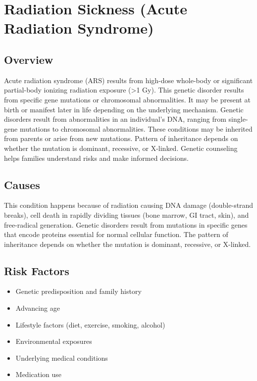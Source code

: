 \chapter{Radiation Sickness (Acute Radiation Syndrome)}
\label{sec:Radiation Sickness}

\section{Overview}
Acute radiation syndrome (ARS) results from high-dose whole-body or significant partial-body ionizing radiation exposure (>1 Gy). This genetic disorder results from specific gene mutations or chromosomal abnormalities. It may be present at birth or manifest later in life depending on the underlying mechanism. Genetic disorders result from abnormalities in an individual's DNA, ranging from single-gene mutations to chromosomal abnormalities. These conditions may be inherited from parents or arise from new mutations. Pattern of inheritance depends on whether the mutation is dominant, recessive, or X-linked. Genetic counseling helps families understand risks and make informed decisions.
\section{Causes}
This condition happens because of radiation causing DNA damage (double-strand breaks), cell death in rapidly dividing tissues (bone marrow, GI tract, skin), and free-radical generation. Genetic disorders result from mutations in specific genes that encode proteins essential for normal cellular function. The pattern of inheritance depends on whether the mutation is dominant, recessive, or X-linked.   
\section{Risk Factors}

\begin{itemize}[noitemsep]
  \item Genetic predisposition and family history
  \item Advancing age
  \item Lifestyle factors (diet, exercise, smoking, alcohol)
  \item Environmental exposures
  \item Underlying medical conditions
  \item Medication use
\end{itemize}
